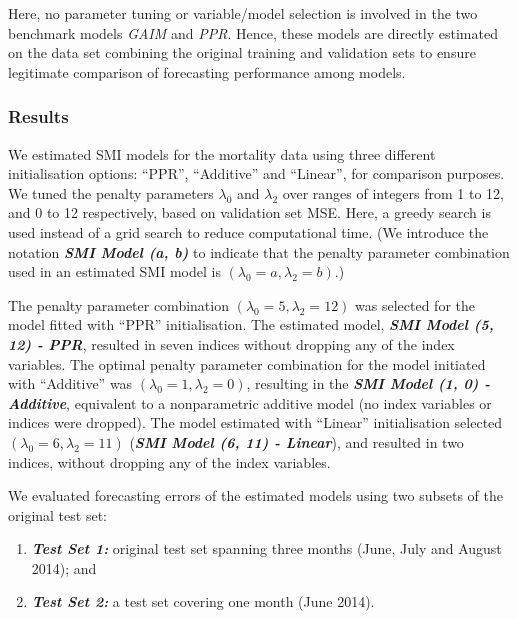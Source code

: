 \documentclass[
  11pt,
  a4paper,
]{article}
\providecommand{\tightlist}{%
  \setlength{\itemsep}{0pt}\setlength{\parskip}{0pt}}\usepackage{longtable,booktabs,array}
\begin{document}
Here, no parameter tuning or variable/model selection is involved in the
two benchmark models \emph{GAIM} and \emph{PPR}. Hence, these models are
directly estimated on the data set combining the original training and
validation sets to ensure legitimate comparison of forecasting
performance among models.

\subsubsection{Results}\label{results}

We estimated SMI models for the mortality data using three different
initialisation options: ``PPR'', ``Additive'' and ``Linear'', for
comparison purposes. We tuned the penalty parameters \(\lambda_{0}\) and
\(\lambda_{2}\) over ranges of integers from 1 to 12, and 0 to 12
respectively, based on validation set MSE. Here, a greedy search is used
instead of a grid search to reduce computational time. (We introduce the
notation \textbf{\emph{SMI Model (a, b)}} to indicate that the penalty
parameter combination used in an estimated SMI model is
\((\lambda_{0} = a, \lambda_{2} = b)\).)

The penalty parameter combination
\((\lambda_{0} = 5, \lambda_{2} = 12)\) was selected for the model
fitted with ``PPR'' initialisation. The estimated model,
\textbf{\emph{SMI Model (5, 12) - PPR}}, resulted in seven indices
without dropping any of the index variables. The optimal penalty
parameter combination for the model initiated with ``Additive'' was
\((\lambda_{0} = 1, \lambda_{2} = 0)\), resulting in the
\textbf{\emph{SMI Model (1, 0) - Additive}}, equivalent to a
nonparametric additive model (no index variables or indices were
dropped). The model estimated with ``Linear'' initialisation selected
\((\lambda_{0} = 6, \lambda_{2} = 11)\) (\textbf{\emph{SMI Model (6, 11)
- Linear}}), and resulted in two indices, without dropping any of the
index variables.

We evaluated forecasting errors of the estimated models using two
subsets of the original test set:

\begin{enumerate}
\def\labelenumi{\arabic{enumi}.}
\tightlist
\item
  \textbf{\emph{Test Set 1:}} original test set spanning three months
  (June, July and August 2014); and
\item
  \textbf{\emph{Test Set 2:}} a test set covering one month (June 2014).
\end{enumerate}
\end{document}
